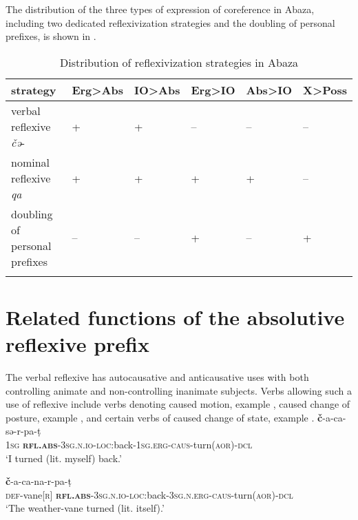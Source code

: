 \documentclass[output=paper]{langscibook}
\begin{document}
The distribution of the three types of expression of coreference in Abaza, including two dedicated reflexivization strategies and the doubling of personal prefixes, is shown in .



\begin{table}

\begin{tabularx}{\textwidth}{p{3.5cm}XXXXX}
\lsptoprule
strategy & Erg>Abs & IO>Abs & Erg>IO & Abs>IO & X>Poss\\
\hline
verbal reflexive \textit{č{ə}}- & + & + & – & – & –\\
nominal reflexive \textit{qa} & + & + & + & + & –\\
doubling of personal prefixes & – & – & + & – & +\\
\lspbottomrule
\end{tabularx}
\caption{Distribution of reflexivization strategies in Abaza}
\label{tab:Arkadiev:5}
\end{table}


\section{Related functions of the absolutive reflexive prefix}\label{sec:Arkadiev:3}

The verbal reflexive has autocausative and anticausative uses with both controlling animate and non-controlling inanimate subjects. Verbs allowing such a use of reflexive include verbs denoting caused motion, example , caused change of posture, example , and certain verbs of caused change of state, example .
\label{ex:Arkadiev:52}
    \ea 
    \label{ex:Arkadiev:52a}
    \ea
      \textbf{{č}}{{}-a-ca-s{ə}-r-pa-t{̣}}\\
      \textsc{1sg}  \textbf{\textsc{rfl.abs}}\textsc{{}-3sg.n.io-loc:}back\textsc{{}-1sg.erg-caus-}turn(\textsc{aor})\textsc{{}-dcl}\\
    \glt  ‘I turned (lit. myself) back.’
    
    \ex 
    \label{ex:Arkadiev:52b}
      \textbf{{č}}{{}-a-ca-na-r-pa-t{̣}}\\
    \textsc{def}{}-vane[\textsc{r}]  \textbf{\textsc{rfl.abs}}\textsc{{}-3sg.n.io-loc:}back\textsc{{}-3sg.n.erg-caus-}turn(\textsc{aor})\textsc{{}-dcl}\\
    \glt  ‘The weather-vane turned (lit. itself).’\z
\z
\end{document}
